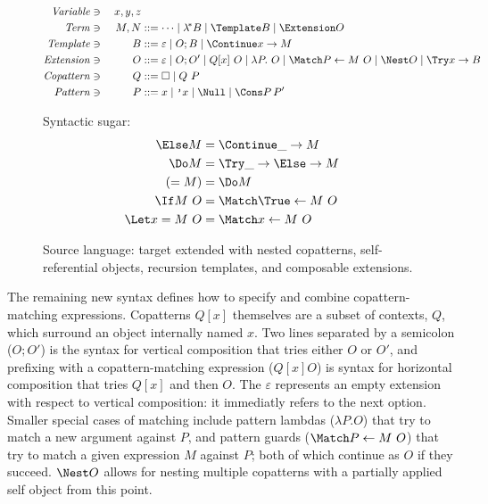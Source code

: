 \begin{figure}
\centering

\begin{alignat*}{2}
  \mathit{Variable} &\ni{}& x, y, z
  \\
  \mathit{Term} &\ni{}& M, N
  &::= \dots
  \mid \lamstar B
  \mid \Template B
  \mid \Extension O
  \\
  \mathit{Template} &\ni{}& B
  &::= \varepsilon
  \mid O; B
  \mid \Continue x \to M
  \\
  \mathit{Extension} &\ni{}& O
  &::= \varepsilon
  \mid O; O'
  \mid Q[x] ~ O
  \mid \lambda P.~ O
  \mid \Match P \gets M ~ O
  \mid \Nest O
  \mid \Try x \to B
  \\
  \mathit{Copattern} &\ni{}& Q
  &::= \hole
  \mid Q ~ P
  \\
  \mathit{Pattern} &\ni{}& P
  &::= x
  \mid \q{x}
  \mid \Null
  \mid \Cons P \, P'
\end{alignat*}

Syntactic sugar:
\begin{align*}
  \Else M
  &=
  \Continue \_ \to M
  \\
  \Do M
  &=
  \Try \_ \to \Else \to M
  \\
  (= M)
  &=
  \Do M
  \\
  \If M ~ O
  &=
  \Match \True \gets M ~ O
  \\
  \Let x = M ~ O
  &=
  \Match x \gets M ~ O
\end{align*}
\caption{Source language: target extended with nested copatterns,
  self-referential objects, recursion templates, and composable extensions.}
\label{fig:source-syntax}
\end{figure}

The remaining new syntax defines how to specify and combine copattern-matching expressions.
Copatterns $Q[x]$ themselves are a subset of contexts, $Q$, which surround an object internally named $x$.
Two lines separated by a semicolon ($O; O'$) is the syntax for vertical composition that tries either $O$ or $O'$, and prefixing with a copattern-matching expression ($Q[x] O$) is syntax for horizontal composition that tries $Q[x]$ and then $O$.
The $\varepsilon$ represents an empty extension with respect to vertical composition: it immediatly refers to the next option.
Smaller special cases of matching include pattern lambdas ($\lambda P. O$) that try to match a new argument against $P$, and pattern guards ($\Match P \gets M ~ O$) that try to match a given expression $M$ against $P$; both of which continue as $O$ if they succeed.
$\Nest O$ allows for nesting multiple copatterns with a partially applied self object from this point.

